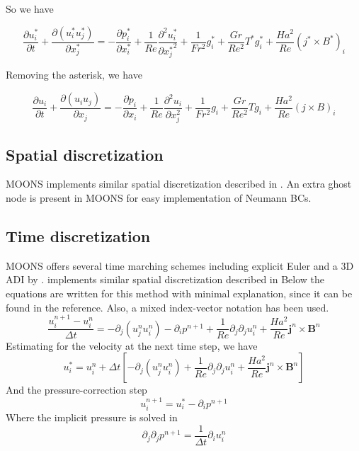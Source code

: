 \documentclass[11pt]{article}
\newcommand{\B}{\mathbf{B}}
\newcommand{\PD}{\partial}
\newcommand{\J}{\mathbf{j}}
\begin{document}
So we have

\begin{equation}
	\frac{\PD u_i^*}{\PD t} +
	\frac{\PD (u_i^* u_j^*)}{\PD x_j^*}
	=
	- \frac{\PD p_i^*}{\PD x_i^*}
	+ \frac{1}{Re}
	\frac{\PD^2 u_i^*}{\PD {x_j^*}^2}
	+ \frac{1}{Fr^2}
	g_i^*
	+ \frac{Gr}{Re^2}
	T^*g_i^*
	+ \frac{Ha^2}{Re}
	(j^* \times B^*)_i
\end{equation}

Removing the asterisk, we have

\begin{equation}
	\boxed{
	\frac{\PD u_i}{\PD t} +
	\frac{\PD (u_i u_j)}{\PD x_j}
	=
	- \frac{\PD p_i}{\PD x_i}
	+ \frac{1}{Re}
	\frac{\PD^2 u_i}{\PD x_j^2}
	+ \frac{1}{Fr^2}
	g_i
	+ \frac{Gr}{Re^2}
	T g_i
	+ \frac{Ha^2}{Re}
	(j \times B)_i
	}
\end{equation}


\subsection{Spatial discretization}
MOONS implements similar spatial discretization described in \cite{griebel1997numerical}. An extra ghost node is present in MOONS for easy implementation of Neumann BCs.

\subsection{Time discretization}
MOONS offers several time marching schemes including explicit Euler and a 3D ADI by . implements similar spatial discretization described in \cite{griebel1997numerical}
Below the equations are written for this method with minimal explanation, since it can be found in the reference. Also, a mixed index-vector notation has been used.
\begin{equation}
	\frac{u_i^{n+1}- u_i^{n}}{\Delta t} = - \PD_j (u_j^{n} u_i^{n})
	-\PD_i  p^{n+1} +
	\frac{1}{Re} \PD_j \PD_j u_i^{n} +
	\frac{Ha^2}{Re} \J^n \times \B^n
\end{equation}
Estimating for the velocity at the next time step, we have
\begin{equation}
	u_i^* = u_i^{n} + \Delta t \left[ - \PD_j (u_j^{n} u_i^{n}) +
	\frac{1}{Re} \PD_j \PD_j u_i^{n} +
	\frac{Ha^2}{Re} \J^n \times \B^n \right]
\end{equation}
And the pressure-correction step
\begin{equation}
	u_i^{n+1} = u_i^* -\PD_i p^{n+1}
\end{equation}
Where the implicit pressure is solved in
\begin{equation}
	\PD_j \PD_j p^{n+1} = \frac{1}{\Delta t} \PD_i u_i^n
\end{equation}




\end{document}
